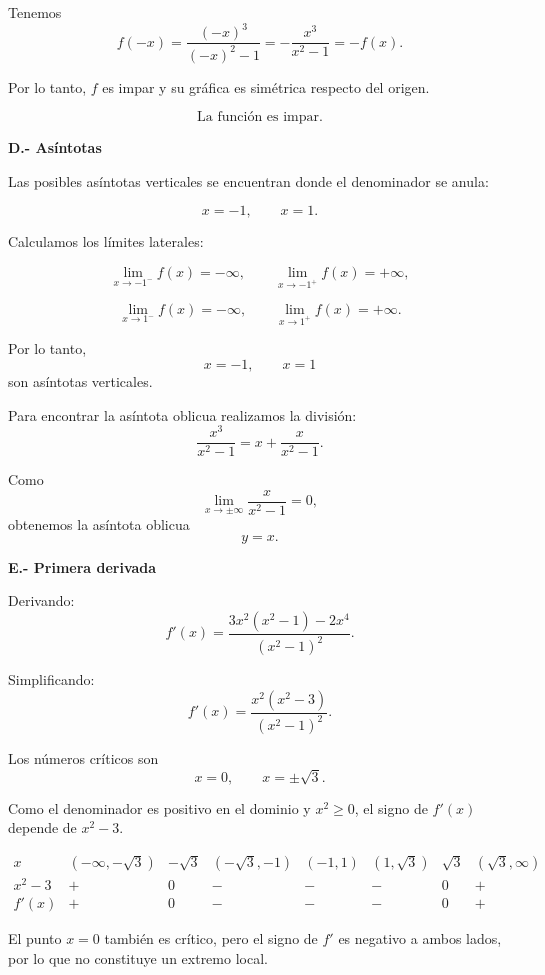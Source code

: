 \documentclass[12pt]{article}
\begin{document}
\begin{enumerate}[label=\alph*.-]
    Tenemos
    \[
    f(-x)
    =
    \frac{(-x)^3}{(-x)^2-1}
    =
    -\frac{x^3}{x^2-1}
    =
    -f(x).
    \]

    Por lo tanto, $f$ es impar y su gráfica es simétrica respecto
    del origen.

    \[
    \boxed{\text{La función es impar.}}
    \]

				\newpage
    \textbf{D.- Asíntotas}

    Las posibles asíntotas verticales se encuentran donde el denominador
    se anula:

    \[
    x=-1,\qquad x=1.
    \]

    Calculamos los límites laterales:

    \[
    \lim_{x\to-1^-}f(x)=-\infty,
    \qquad
    \lim_{x\to-1^+}f(x)=+\infty,
    \]

    \[
    \lim_{x\to1^-}f(x)=-\infty,
    \qquad
    \lim_{x\to1^+}f(x)=+\infty.
    \]

    Por lo tanto,
    \[
    \boxed{x=-1,\qquad x=1}
    \]
    son asíntotas verticales.

    Para encontrar la asíntota oblicua realizamos la división:
    \[
    \frac{x^3}{x^2-1}
    =
    x+\frac{x}{x^2-1}.
    \]

    Como
    \[
    \lim_{x\to\pm\infty}\frac{x}{x^2-1}=0,
    \]
    obtenemos la asíntota oblicua
    \[
    \boxed{y=x}.
    \]

    \textbf{E.- Primera derivada}

    Derivando:
    \[
    f'(x)
    =
    \frac{3x^2(x^2-1)-2x^4}{(x^2-1)^2}.
    \]

    Simplificando:
    \[
    f'(x)
    =
    \frac{x^2(x^2-3)}{(x^2-1)^2}.
    \]

    Los números críticos son
    \[
    x=0,\qquad x=\pm\sqrt3.
    \]

    Como el denominador es positivo en el dominio y $x^2\geq0$,
    el signo de $f'(x)$ depende de $x^2-3$.

    \[
    \begin{array}{c|ccccccc}
    x &
    (-\infty,-\sqrt3) &
    -\sqrt3 &
    (-\sqrt3,-1) &
    (-1,1) &
    (1,\sqrt3) &
    \sqrt3 &
    (\sqrt3,\infty)
    \\
    \hline
    x^2-3 & + & 0 & - & - & - & 0 & +\\
    \hline
    f'(x) & + & 0 & - & - & - & 0 & +
    \end{array}
    \]

    El punto $x=0$ también es crítico, pero el signo de $f'$ es
    negativo a ambos lados, por lo que no constituye un extremo local.


\end{enumerate}
\end{document}
